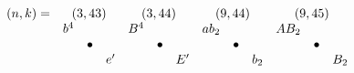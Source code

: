 \documentclass{article}
\begin{document}
\(
\begin{array}{crclrclrclrclrclrclrclrcl}
  (n,k)= & \multicolumn{3}{c}{(3,43)} & \multicolumn{3}{c}{(3,44)} & \multicolumn{3}{c}{(9,44)} & \multicolumn{3}{c}{(9,45)} & \\
  & b^4 & & & B^4 & & & ab_2 & & & AB_2 & & & \\
  & & \bullet & & & \bullet & & & \bullet & & & \bullet & \\
  & & & e' & & & E' & & & b_2& & & B_2 & 
\end{array}
\)\\
\end{document}
